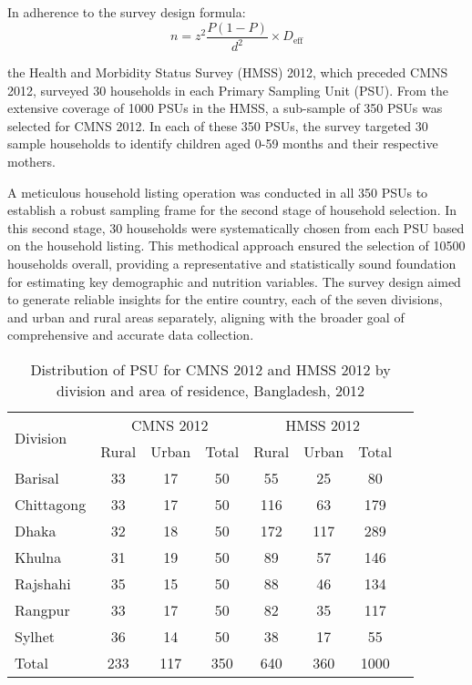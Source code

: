 \documentclass{report}
\begin{document}
In adherence to the survey design formula: 
\[ n = z^2 \frac{P(1-P)}{d^2} \times D_{\text{eff}} \]

the Health and Morbidity Status Survey (HMSS) 2012, which preceded CMNS 2012, surveyed 30 households in each Primary Sampling Unit (PSU). From the extensive coverage of 1000 PSUs in the HMSS, a sub-sample of 350 PSUs was selected for CMNS 2012. In each of these 350 PSUs, the survey targeted 30 sample households to identify children aged 0-59 months and their respective mothers.


A meticulous household listing operation was conducted in all 350 PSUs to establish a robust sampling frame for the second stage of household selection. In this second stage, 30 households were systematically chosen from each PSU based on the household listing. This methodical approach ensured the selection of 10500 households overall, providing a representative and statistically sound foundation for estimating key demographic and nutrition variables. The survey design aimed to generate reliable insights for the entire country, each of the seven divisions, and urban and rural areas separately, aligning with the broader goal of comprehensive and accurate data collection.

\begin{table}[ht]
\centering
\caption{Distribution of PSU for CMNS 2012 and HMSS 2012 by division and area of residence, Bangladesh, 2012}

\label{tab:psu_distribution}
\begin{tabular}{lccccccc}
\toprule
\multirow{2}{*}{Division} & \multicolumn{3}{c}{CMNS 2012} & \multicolumn{3}{c}{HMSS 2012}\\
\cmidrule(lr){2-4} \cmidrule(lr){5-7}
& Rural & Urban & Total & Rural & Urban & Total & \\
\midrule
Barisal & 33 & 17 & 50 & 55 & 25 & 80 \\
Chittagong & 33 & 17 & 50 & 116 & 63 & 179 \\
Dhaka & 32 & 18 & 50 & 172 & 117 & 289 \\
Khulna & 31 & 19 & 50 & 89 & 57 & 146 \\
Rajshahi & 35 & 15 & 50 & 88 & 46 & 134 \\
Rangpur & 33 & 17 & 50 & 82 & 35 & 117 \\
Sylhet & 36 & 14 & 50 & 38 & 17 & 55 \\
\midrule
Total & 233 & 117 & 350 & 640 & 360 & 1000 \\
\bottomrule
\end{tabular}
\end{table}
\end{document}
